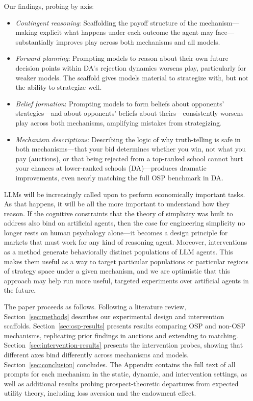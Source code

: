 \documentclass[format=acmsmall, review=false]{acmart}
\begin{document}
Our findings, probing by axis:
\begin{itemize}[noitemsep]
    \item \textit{Contingent reasoning}: Scaffolding the payoff structure of the mechanism---making explicit what happens under each outcome the agent may face---substantially improves play across both mechanisms and all models.
    \item \textit{Forward planning}: Prompting models to reason about their own future decision points within DA's rejection dynamics worsens play, particularly for weaker models. The scaffold gives models material to strategize with, but not the ability to strategize well.
    \item \textit{Belief formation}: Prompting models to form beliefs about opponents' strategies---and about opponents' beliefs about theirs---consistently worsens play across both mechanisms, amplifying mistakes from strategizing.
    \item \textit{Mechanism descriptions}: Describing the logic of why truth-telling is safe in both mechanisms---that your bid determines whether you win, not what you pay (auctions), or that being rejected from a top-ranked school cannot hurt your chances at lower-ranked schools (DA)---produces dramatic improvements, even nearly matching the full OSP benchmark in DA.
\end{itemize}

LLMs will be increasingly called upon to perform economically important tasks. As that happens, it will be all the more important to understand how they reason. If the cognitive constraints that the theory of simplicity was built to address also bind on artificial agents, then the case for engineering simplicity no longer rests on human psychology alone---it becomes a design principle for markets that must work for any kind of reasoning agent. Moreover, interventions as a method generate behaviorally distinct populations of LLM agents. This makes them useful as a way to target particular populations or particular regions of strategy space under a given mechanism, and we are optimistic that this approach may help run more useful, targeted experiments over artificial agents in the future.

The paper proceeds as follows. Following a literature review, Section~\ref{sec:methods} describes our experimental design and intervention scaffolds. Section~\ref{sec:osp-results} presents results comparing OSP and non-OSP mechanisms, replicating prior findings in auctions and extending to matching. Section~\ref{sec:intervention-results} presents the intervention probes, showing that different axes bind differently across mechanisms and models. Section~\ref{sec:conclusion} concludes. The Appendix contains the full text of all prompts for each mechanism in the static, dynamic, and intervention settings, as well as additional results probing prospect-theoretic departures from expected utility theory, including loss aversion and the endowment effect.
\end{document}
